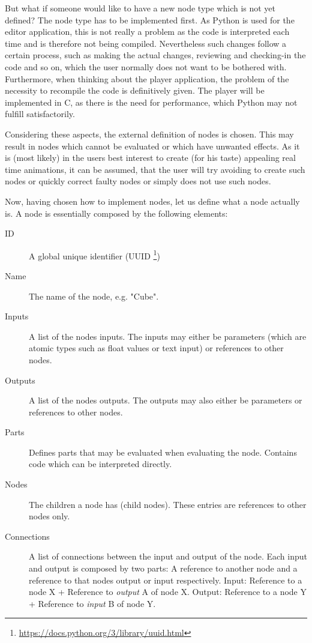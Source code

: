 \documentclass[10pt, openright, notitlepage]{scrreprt}
\begin{document}
But what if someone would like to have a new node type which is not yet defined?
The node type has to be implemented first. As Python is used for the editor
application, this is not really a problem as the code is interpreted each time
and is therefore not being compiled. Nevertheless such changes follow a certain
process, such as making the actual changes, reviewing and checking-in the code
and so on, which the user normally does not want to be bothered with.
Furthermore, when thinking about the player application, the problem of the
necessity to recompile the code is definitively given. The player will be
implemented in C, as there is the need for performance, which Python may not
fulfill satisfactorily.

Considering these aspects, the external definition of nodes is chosen. This may
result in nodes which cannot be evaluated or which have unwanted effects. As it
is (most likely) in the users best interest to create (for his taste) appealing
real time animations, it can be assumed, that the user will try avoiding to
create such nodes or quickly correct faulty nodes or simply does not use such
nodes.

Now, having chosen how to implement nodes, let us define what a node actually
is. A node is essentially composed by the following elements:

\begin{description}
\item[{ID         }] A global unique identifier (UUID
\footnote{\url{https://docs.python.org/3/library/uuid.html}})
\item[{Name       }] The name of the node, e.g. "Cube".
\item[{Inputs     }] A list of the nodes inputs. The inputs may either be parameters
(which are atomic types such as float values or text input)
or references to other nodes.
\item[{Outputs    }] A list of the nodes outputs. The outputs may also either be
parameters or references to other nodes.
\item[{Parts      }] Defines parts that may be evaluated when evaluating the node.
Contains code which can be interpreted directly.
\item[{Nodes      }] The children a node has (child nodes). These entries are
references to other nodes only.
\item[{Connections}] A list of connections between the input and output of the node.
Each input and output is composed by two parts: A reference to
another node and a reference to that nodes output or input
respectively.
Input: Reference to a node X + Reference to \emph{output} A of node X.
Output: Reference to a node Y + Reference to \emph{input} B of node Y.
\end{description}
\end{document}
